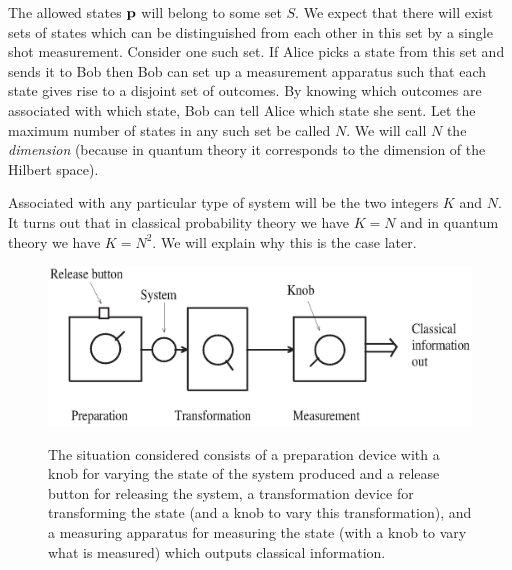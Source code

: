 \documentclass[12pt]{article}
\begin{document}
The allowed states ${\bf p}$ will belong to some set $S$.  We expect
that there will exist sets of states which can be distinguished from each other
in this set by a single shot measurement.  Consider one such set. If
Alice picks a state from this set and sends it to Bob
then Bob can set up a measurement
apparatus such that each state gives rise to a disjoint set of outcomes.
By knowing which outcomes are associated with which state, Bob can tell
Alice which state she sent.  Let the maximum number of states in any
such set be called $N$.  We will call $N$ the {\it dimension} (because in
quantum theory it corresponds to the dimension of the Hilbert space).

Associated with any particular type of system will be the two integers
$K$ and $N$.  It turns out that in classical probability theory we have
$K=N$ and in quantum theory we have $K=N^2$.  We will explain why this
is the case later.

\begin{figure}[t]
\begin{center}
{\includegraphics[width=5in]{qaxiomf1.eps}}
\end{center}
\caption{\small The situation considered consists of a preparation device with
a knob for varying the state of the system produced and a release button
for releasing the system, a transformation device for transforming the
state (and a knob to vary this transformation), and a measuring
apparatus for measuring the state (with a knob to vary what is measured)
which outputs classical information.}
\end{figure}
\end{document}
